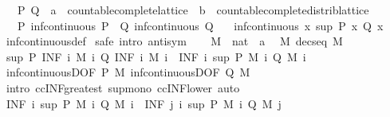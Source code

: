 \begin{isabellebody}
\ \ \ P\ Q\ {\isacharcolon}{\isacharcolon}\ {\isachardoublequoteopen}{\isacharprime}a\ {\isacharcolon}{\isacharcolon}\ countable{\isacharunderscore}complete{\isacharunderscore}lattice\ {\isasymRightarrow}\ {\isacharprime}b\ {\isacharcolon}{\isacharcolon}\ countable{\isacharunderscore}complete{\isacharunderscore}distrib{\isacharunderscore}lattice{\isachardoublequoteclose}\isanewline
\ \ \ P{\isacharcolon}\ {\isachardoublequoteopen}inf{\isacharunderscore}continuous\ P{\isachardoublequoteclose}\ \ Q{\isacharcolon}\ {\isachardoublequoteopen}inf{\isacharunderscore}continuous\ Q{\isachardoublequoteclose}\isanewline
\ \ \ {\isachardoublequoteopen}inf{\isacharunderscore}continuous\ {\isacharparenleft}{\isasymlambda}x{\isachardot}\ sup\ {\isacharparenleft}P\ x{\isacharparenright}\ {\isacharparenleft}Q\ x{\isacharparenright}{\isacharparenright}{\isachardoublequoteclose}\isanewline
%
\isadelimproof
\ \ %
\endisadelimproof
%
\isatagproof
{}\isamarkupfalse%
\ inf{\isacharunderscore}continuous{\isacharunderscore}def\isanewline
{}\isamarkupfalse%
\ {\isacharparenleft}safe\ intro{\isacharbang}{\isacharcolon}\ antisym{\isacharparenright}\isanewline
\ \ \isamarkupfalse%
\ M\ {\isacharcolon}{\isacharcolon}\ {\isachardoublequoteopen}nat\ {\isasymRightarrow}\ {\isacharprime}a{\isachardoublequoteclose}\ \isamarkupfalse%
\ M{\isacharcolon}\ {\isachardoublequoteopen}decseq\ M{\isachardoublequoteclose}\isanewline
\ \ \isamarkupfalse%
\ {\isachardoublequoteopen}sup\ {\isacharparenleft}P\ {\isacharparenleft}INF\ i{\isachardot}\ M\ i{\isacharparenright}{\isacharparenright}\ {\isacharparenleft}Q\ {\isacharparenleft}INF\ i{\isachardot}\ M\ i{\isacharparenright}{\isacharparenright}\ {\isasymle}\ {\isacharparenleft}INF\ i{\isachardot}\ sup\ {\isacharparenleft}P\ {\isacharparenleft}M\ i{\isacharparenright}{\isacharparenright}\ {\isacharparenleft}Q\ {\isacharparenleft}M\ i{\isacharparenright}{\isacharparenright}{\isacharparenright}{\isachardoublequoteclose}\isanewline
\ \ \ \ \isamarkupfalse%
\ inf{\isacharunderscore}continuousD{\isacharbrackleft}OF\ P\ M{\isacharbrackright}\ inf{\isacharunderscore}continuousD{\isacharbrackleft}OF\ Q\ M{\isacharbrackright}\ \isamarkupfalse%
\ {\isacharparenleft}intro\ ccINF{\isacharunderscore}greatest\ sup{\isacharunderscore}mono\ ccINF{\isacharunderscore}lower{\isacharparenright}\ auto\isanewline
\isanewline
\ \ \isamarkupfalse%
\ {\isachardoublequoteopen}{\isacharparenleft}INF\ i{\isachardot}\ sup\ {\isacharparenleft}P\ {\isacharparenleft}M\ i{\isacharparenright}{\isacharparenright}\ {\isacharparenleft}Q\ {\isacharparenleft}M\ i{\isacharparenright}{\isacharparenright}{\isacharparenright}\ {\isasymle}\ {\isacharparenleft}INF\ j\ i{\isachardot}\ sup\ {\isacharparenleft}P\ {\isacharparenleft}M\ i{\isacharparenright}{\isacharparenright}\ {\isacharparenleft}Q\ {\isacharparenleft}M\ j{\isacharparenright}{\isacharparenright}{\isacharparenright}{\isachardoublequoteclose}\isanewline

\end{isabellebody}
